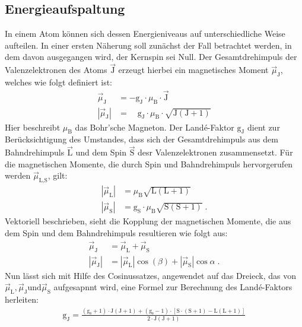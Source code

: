 \subsection{Energieaufspaltung}
In einem Atom können sich dessen Energieniveaus auf unterschiedliche Weise aufteilen.
In einer ersten Näherung soll zunächst der Fall betrachtet werden, in dem davon ausgegangen wird, der
Kernspin sei Null.
Der Gesamtdrehimpuls der Valenzelektronen des Atoms $\vec{\text{J}}$ erzeugt hierbei
ein magnetisches Moment $\vec{\mu}_{\text{J}}$, welches wie folgt definiert ist:
\begin{align*}
    \vec{\mu}_{\text{J}} &= -\text{g}_{\text{J}} \cdot \mu_{\text{B}} \cdot \vec{\text{J}} \\
    |\vec{\mu}_{\text{J}}| &= \hspace{1em} \text{g}_{\text{J}} \cdot \mu_{\text{B}} \cdot \sqrt{ \text{J} (\text{J}+1) }
\end{align*}
Hier beschreibt $\mu_{\text{B}}$ das Bohr'sche Magneton.
Der Landé-Faktor $\text{g}_{\text{J}}$ dient zur Berücksichtigung des Umstandes, dass sich der Gesamtdrehimpuls aus dem Bahndrehimpuls $\vec{\text{L}}$ und dem Spin $\vec{\text{S}}$ desr Valenzelektronen zusammensetzt.
Für die magnetischen Momente, die durch Spin und Bahndrehimpuls hervorgerufen werden $\vec{\mu}_{\text{L,S}}$, gilt:
\begin{align*}
    |\vec{\mu}_{\text{L}}| &= \mu_{\text{B}} \sqrt{\text{L} (\text{L}+1)} \\
    |\vec{\mu}_{\text{S}}| &= \text{g}_{\text{S}} \cdot \mu_{\text{B}} \sqrt{\text{S}(\text{S}+1)} \; .
\end{align*}
Vektoriell beschrieben, sieht die Kopplung der magnetischen Momente, die aus dem Spin und dem Bahndrehimpuls resultieren wie folgt aus:
\begin{align*}
    \vec{\mu}_{\text{J}} &= \vec{\mu}_{\text{L}} + \vec{\mu}_{\text{S}} \\
    |\vec{\mu}_{\text{J}}| &= |\vec{\mu}_{\text{L}}| \cos(\beta) + |\vec{\mu}_{\text{S}}| \cos{\alpha} \; .
\end{align*}
Nun lässt sich mit Hilfe des Cosinussatzes, angewendet auf das Dreieck, das von $\vec{\mu}_{\text{L}}, \vec{\mu}_{\text{J}} \text{und} \vec{\mu}_{\text{S}}$ aufgesapnnt wird, eine Formel zur Berechnung des Landé-Faktors herleiten:
\begin{align}
    \text{g}_{\text{J}} = \frac{(\text{g}_{\text{s}} + 1) \cdot \text{J} (\text{J} + 1) + (\text{g}_{\text{s}}-1) \cdot \left[\text{S}
    \cdot (\text{S}+1) - \text{L} (\text{L} + 1) \right]}{2 \cdot \text{J} (\text{J} +1 )}
    \label{eq:La-Fa.gj}
\end{align}
